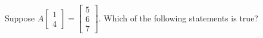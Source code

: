 \documentclass{ximera}
\begin{document}
             \begin{question} Suppose $A\begin{bmatrix} 1\\4\end{bmatrix} = \begin{bmatrix} 5\\6\\7\end{bmatrix}$. Which of the following statements is true?
             	
             	\begin{multipleChoice}
             	
             	\end{multipleChoice}
             	
             \end{question}	
     
  
\end{document}
